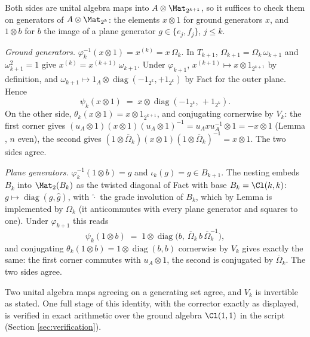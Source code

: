Both sides are unital algebra maps into $A \otimes \Mat_{2^{k+1}}$, so it suffices to check them on generators of $A \otimes \Mat_{2^k}$: the elements $x \otimes 1$ for ground generators $x$, and $1 \otimes b$ for $b$ the image of a plane generator $g \in \{e_j, f_j\}$, $j \leq k$.

\emph{Ground generators.} $\varphi_k^{-1}(x \otimes 1) = x^{(k)} = x\,\Omega_k$. In $T_{k+1}$, $\Omega_{k+1} = \Omega_k\, \omega_{k+1}$ and $\omega_{k+1}^2 = 1$ give $x^{(k)} = x^{(k+1)}\, \omega_{k+1}$. Under $\varphi_{k+1}$, $x^{(k+1)} \mapsto x \otimes 1_{2^{k+1}}$ by definition, and $\omega_{k+1} \mapsto 1_A \otimes \operatorname{diag}(-1_{2^k}, +1_{2^k})$ by Fact  for the outer plane. Hence
\[
\psi_k(x \otimes 1) \;=\; x \otimes \operatorname{diag}(-1_{2^k},\, +1_{2^k}).
\]
On the other side, $\theta_k(x \otimes 1) = x \otimes 1_{2^{k+1}}$, and conjugating cornerwise by $V_k$: the first corner gives $(u_A \otimes 1)(x \otimes 1)(u_A \otimes 1)^{-1} = u_A x u_A^{-1} \otimes 1 = -x \otimes 1$ (Lemma , $n$ even), the second gives $(1 \otimes \overline\Omega_k)(x \otimes 1)(1 \otimes \overline\Omega_k)^{-1} = x \otimes 1$. The two sides agree.

\emph{Plane generators.} $\varphi_k^{-1}(1 \otimes b) = g$ and $\iota_k(g) = g \in B_{k+1}$. The nesting embeds $B_k$ into $\Mat_2(B_k)$ as the twisted diagonal of Fact  with base $B_k = \Cl(k,k)$: $g \mapsto \operatorname{diag}(g, \hat g)$, with $\hat{\cdot}$ the grade involution of $B_k$, which by Lemma  is implemented by $\Omega_k$ (it anticommutes with every plane generator and squares to one). Under $\varphi_{k+1}$ this reads
\[
\psi_k(1 \otimes b) \;=\; 1 \otimes \operatorname{diag}\bigl(b,\ \overline\Omega_k\, b\, \overline\Omega_k^{-1}\bigr),
\]
and conjugating $\theta_k(1 \otimes b) = 1 \otimes \operatorname{diag}(b, b)$ cornerwise by $V_k$ gives exactly the same: the first corner commutes with $u_A \otimes 1$, the second is conjugated by $\overline\Omega_k$. The two sides agree.

Two unital algebra maps agreeing on a generating set agree, and $V_k$ is invertible as stated. One full stage of this identity, with the corrector exactly as displayed, is verified in exact arithmetic over the ground algebra $\Cl(1,1)$ in the script (Section \ref{sec:verification}).
